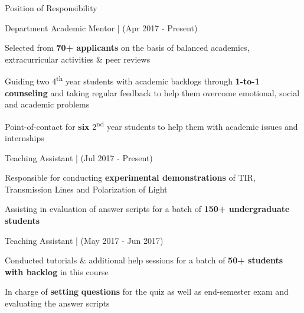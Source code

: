 \documentclass{resume} %
\begin{document}
\begin{rSection}{Position of Responsibility}

\begin{rSubsection}{Department Academic Mentor  | }{(Apr 2017 - Present)}{}{}
\item Selected from \textbf{70+ applicants} on the basis of balanced academics, extracurricular activities \& peer reviews 
\item Guiding two 4\textsuperscript{th} year students with academic backlogs through \textbf{1-to-1 counseling} and taking regular feedback to help them overcome emotional, social and academic problems
\item Point-of-contact for \textbf{six} 2\textsuperscript{nd} year students to help them with academic issues and internships
\end{rSubsection}

\newpage

\begin{rSubsection}{Teaching Assistant | }{(Jul 2017 - Present)}{}{}
 \item Responsible for conducting \textbf{experimental demonstrations} of TIR, Transmission Lines and Polarization of Light
 \item Assisting in evaluation of answer scripts for a batch of \textbf{150+ undergraduate students }
\end{rSubsection}

\vspace{-0.2em}

\begin{rSubsection}{Teaching Assistant | }{(May 2017 - Jun 2017)}{}{}
 \item Conducted tutorials \& additional help sessions for a batch of \textbf{50+ students with backlog} in this course
 \item In charge of \textbf{setting} \textbf{questions} for the quiz as well as end-semester exam and evaluating the answer scripts
   
\end{rSubsection}
\end{rSection}
\end{document}
